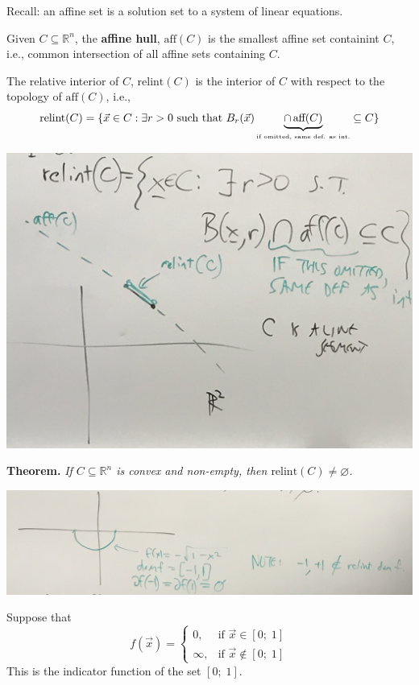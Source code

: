 \documentclass{article}
\newcommand{\R}{\mathbb{R}}             %
\newcommand{\x}{\vec{x}}
\newcommand{\relint}{\text{relint}}     %
\begin{document}
Recall: an affine set is a solution set to a system of linear equations.

Given $C \subseteq \R^n$, the \textbf{affine hull}, $\text{aff}(C)$ is the smallest affine set containint $C$, i.e., common intersection of all affine sets containing $C$.

The relative interior of $C$, $\relint(C)$ is the interior of $C$ with respect to the topology of $\text{aff}(C)$, i.e.,
\[
    \relint(C) = \{\x \in C : \exists r > 0 \text{ such that } B_r(\x) \underbrace{\cap\, \text{aff}(C)}_{\text{\tiny if omitted, same def. as int.}} \subseteq C \}
\]

\begin{center}
    \includegraphics[scale=0.08]{affine_set.JPG}
\end{center}

\textbf{Theorem.} \textit{If $C \subseteq \R^n$ is convex and non-empty, then $\relint(C) \neq \varnothing$.}

\begin{center}
    \includegraphics[scale=0.1]{relative_interior.JPG}
\end{center}

Suppose that
\[
    f(\x) = \begin{cases}
        0, & \text{if } \x \in [0;\; 1] \\
        \infty, & \text{if } \x \notin [0;\; 1]
    \end{cases}
\]
This is the indicator function of the set $[0;\; 1]$.
\end{document}

